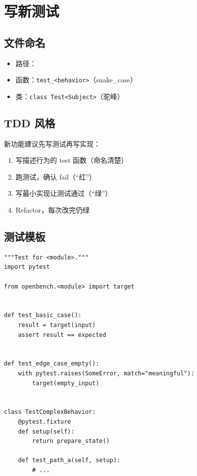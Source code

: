 \section{写新测试}

\subsection{文件命名}

\begin{itemize}
  \item 路径：
  \item 函数：\texttt{test\_<behavior>}（snake\_case）
  \item 类：\texttt{class Test<Subject>}（驼峰）
\end{itemize}

\subsection{TDD 风格}

新功能建议先写测试再写实现：

\begin{enumerate}
  \item 写描述行为的 test 函数（命名清楚）
  \item 跑测试，确认 fail（“红”）
  \item 写最小实现让测试通过（“绿”）
  \item Refactor，每次改完仍绿
\end{enumerate}

\subsection{测试模板}

\begin{verbatim}
"""Test for <module>."""
import pytest

from openbench.<module> import target


def test_basic_case():
    result = target(input)
    assert result == expected


def test_edge_case_empty():
    with pytest.raises(SomeError, match="meaningful"):
        target(empty_input)


class TestComplexBehavior:
    @pytest.fixture
    def setup(self):
        return prepare_state()

    def test_path_a(self, setup):
        # ...
\end{verbatim}

